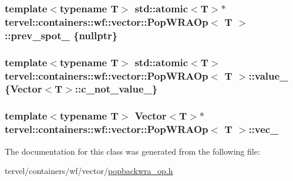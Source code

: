 \subsubsection[{prev\+\_\+spot\+\_\+}]{\setlength{\rightskip}{0pt plus 5cm}template$<$typename T$>$ std\+::atomic$<$T$>$$\ast$ {\bf tervel\+::containers\+::wf\+::vector\+::\+Pop\+W\+R\+A\+Op}$<$ T $>$\+::prev\+\_\+spot\+\_\+ \{nullptr\}\hspace{0.3cm}{\ttfamily [private]}}\label{classtervel_1_1containers_1_1wf_1_1vector_1_1_pop_w_r_a_op_af59ca2f59473f47e6bd91eb510a2db84}
\hypertarget{classtervel_1_1containers_1_1wf_1_1vector_1_1_pop_w_r_a_op_a4b7f4c44861229e9388d0458a52da214}{}
\subsubsection[{value\+\_\+}]{\setlength{\rightskip}{0pt plus 5cm}template$<$typename T$>$ std\+::atomic$<$T$>$ {\bf tervel\+::containers\+::wf\+::vector\+::\+Pop\+W\+R\+A\+Op}$<$ T $>$\+::value\+\_\+ \{Vector$<$T$>$\+::c\+\_\+not\+\_\+value\+\_\+\}\hspace{0.3cm}{\ttfamily [private]}}\label{classtervel_1_1containers_1_1wf_1_1vector_1_1_pop_w_r_a_op_a4b7f4c44861229e9388d0458a52da214}
\hypertarget{classtervel_1_1containers_1_1wf_1_1vector_1_1_pop_w_r_a_op_ae0e8adc35df23f084d965aadc3f7de1b}{}
\subsubsection[{vec\+\_\+}]{\setlength{\rightskip}{0pt plus 5cm}template$<$typename T$>$ Vector$<$T$>$$\ast$ {\bf tervel\+::containers\+::wf\+::vector\+::\+Pop\+W\+R\+A\+Op}$<$ T $>$\+::vec\+\_\+\hspace{0.3cm}{\ttfamily [private]}}\label{classtervel_1_1containers_1_1wf_1_1vector_1_1_pop_w_r_a_op_ae0e8adc35df23f084d965aadc3f7de1b}


The documentation for this class was generated from the following file\+:\begin{DoxyCompactItemize}
\item 
tervel/containers/wf/vector/\hyperlink{popbackwra__op_8h}{popbackwra\+\_\+op.\+h}\end{DoxyCompactItemize}
